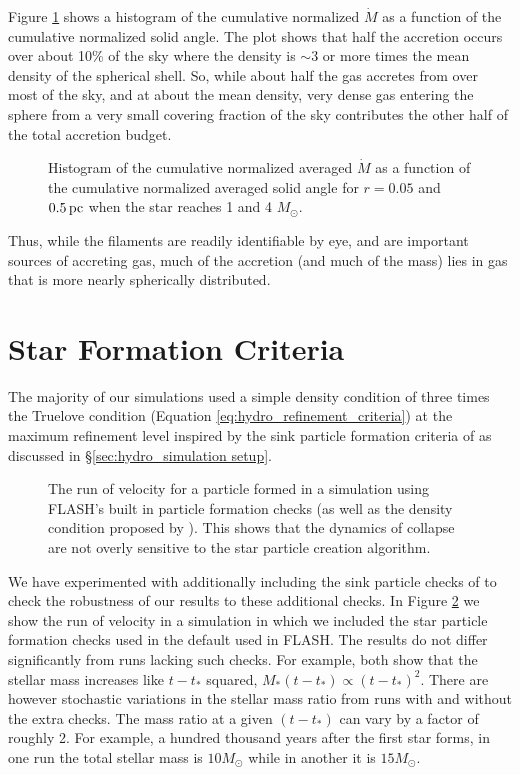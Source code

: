 \documentclass[../dissertation.tex]{subfiles}
\begin{document}
Figure 
\ref{fig:hydro_Accretion_angle_avg} shows a histogram of the cumulative normalized 
$\dot{M}$ as a function of the cumulative normalized solid angle.  
The plot shows that half the accretion occurs over about 10\% of the sky 
where the density is $\sim3$ or more times the mean density of the spherical shell.  
So, while about half the gas accretes from over most of the sky, and at about the mean density,
very dense gas entering the sphere from a very small covering fraction of the sky contributes the other half of the total accretion budget. 
%
\begin{figure}[htb]%
\caption[Hydro Non-filamentary accretion]{Histogram of the cumulative normalized averaged $\dot{M}$ as a function of the cumulative normalized averaged solid angle for $r=0.05$ and $0.5\,\rm pc$ when the star reaches 1 and 4 
$M_{\odot}$. \label{fig:hydro_Accretion_angle_avg}}
\end{figure}

Thus, while the filaments are readily identifiable by eye, and are important sources 
of accreting gas, much of the accretion (and much of the mass) lies in gas that 
is more nearly spherically distributed. 

\section{Star Formation Criteria}
\label{particle_criteria}
The majority of our simulations used a simple density condition of three times the Truelove condition (Equation \ref{eq:hydro_refinement_criteria}) at the maximum refinement level inspired by the sink particle formation criteria of \citet{2011ApJ...730...40P} as discussed in \S \ref{sec:hydro_simulation setup}.
%
%
\begin{figure}[htb]%
\caption[Hydro comparison to particle formation checks]{The run of velocity for a particle formed in a simulation using FLASH's built in particle formation checks (as well as the density condition proposed by \citet{2011ApJ...730...40P}). 
This shows that the dynamics of collapse are not overly sensitive to the star particle creation algorithm. \label{fig:hydro_federrath_particle}}
\end{figure}
%
We have experimented with additionally including the sink particle checks of \citet{2010ApJ...713..269F} to check the robustness of our results to these additional checks. In Figure \ref{fig:hydro_federrath_particle} we show the run of velocity in a simulation in which we included the star particle formation checks used in the default used in FLASH. The results do not differ significantly from runs lacking such checks. For example, both show that the stellar mass increases like $t-t_*$ squared, $M_*(t-t_*) \propto (t-t_*)^2$. There are however stochastic variations in the stellar mass ratio from runs with and without the extra checks. The mass ratio at a given $(t-t_*)$ can vary by a factor of roughly 2. For example, a hundred thousand years after the first star forms, in one run the total stellar mass is $10 M_\odot$ while in another it is $15 M_\odot$.
%
\end{document}
